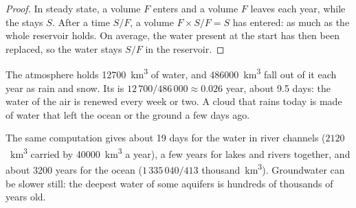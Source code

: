 \begin{proof}
In steady state, a volume $F$ enters and a volume $F$ leaves each year, while
the  stays $S$. After a time $S/F$, a volume $F \times S/F = S$ has
entered: as much as the whole reservoir holds. On average, the water present at
the start has then been replaced, so the water stays $S/F$ in the reservoir.
\end{proof}

\begin{example}\label{ex:g10:freshwater-resources:atmosphere}
The atmosphere holds \num{12700}~\unit{km^3} of water, and
\num{486000}~\unit{km^3} fall out of it each year as rain and snow. Its
 is $12\,700/486\,000 \approx \num{0.026}$ year, about
\num{9.5} days: the water of the air is renewed every week or two. A cloud
that rains today is made of water that left the ocean or the ground a few
days ago.
\end{example}

The same computation gives about \num{19} days for the water in river
channels ($2120$~\unit{km^3} carried by \num{40000}~\unit{km^3} a year), a few
years for lakes and rivers together, and about \num{3200} years for the ocean
($1\,335\,040/413$ thousand~\unit{km^3}). Groundwater can be slower still: the
deepest water of some aquifers is hundreds of thousands of years old.

